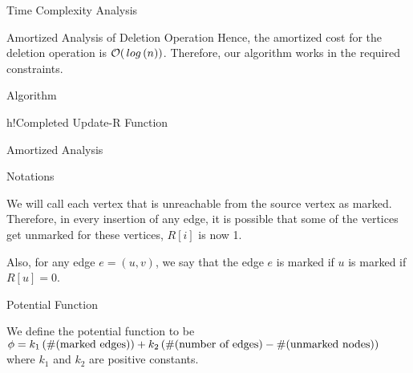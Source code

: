 \documentclass{article}
\begin{document}
\begin{question}
\begin{qsection}{Time Complexity Analysis}
\begin{qsubsection}{Amortized Analysis of Deletion Operation}
			Hence, the amortized cost for the deletion operation is $\bigO{\log{n}}$. Therefore, our algorithm works in the required constraints.

		\end{qsubsection}

	\end{qsection}

\end{question}

\clearpage

\begin{question}

	\begin{qsection}{Algorithm}

		\begin{algo}[0.9\textwidth]{h!}{Completed Update-R Function}
			\begin{algorithmic}
						\EndFor%
					\EndIf%
				\EndProcedure%
			\end{algorithmic}
		\end{algo}

	\end{qsection}

	\begin{qsection}{Amortized Analysis}

		\begin{qsubsection}{Notations}

			We will call each vertex that is unreachable from the source vertex as marked. Therefore, in every insertion of any edge, it is possible that some of the vertices get unmarked  for these vertices, $R[i]$ is now 1. \br%

			Also, for any edge $e = (u, v)$, we say that the edge $e$ is marked if $u$ is marked  if $R[u] = 0$.

		\end{qsubsection}

		\begin{qsubsection}{Potential Function}

			We define the potential function to be $\phi = k_1 \left( \#(\text{marked edges}) \right) + k_2 \left( \#(\text{number of edges}) - \#(\text{unmarked nodes}) \right)$ where $k_1$ and $k_2$ are positive constants. \br%

			 \br%


\end{qsubsection}
\end{qsection}
\end{question}
\end{document}
